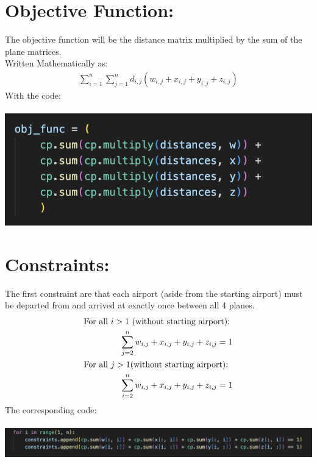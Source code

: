 \documentclass[12pt]{extarticle}
\begin{document}
\section*{\small Objective Function:}
The objective function will be the distance matrix multiplied by the sum of the plane matrices. \\
Written Mathematically as:
\begin{align*}
\sum_{i=1}^n\sum_{j=1}^nd_{i,j}(w_{i,j} + x_{i,j} + y_{i,j} + z_{i,j})
\end{align*}
With the code: \\ \\
\includegraphics[scale = .5]{images/ObjFunc.png}
\section*{\small Constraints:}
The first constraint are that each airport (aside from the starting airport) must be departed from and arrived at exactly once between all 4 planes.
\begin{align*}
&\text{For all } i > 1 \text{ (without starting airport):} \\
&\hspace{1.5cm}\sum_{j=2}^n w_{i,j} + x_{i,j} + y_{i,j} + z_{i,j} = 1 \\
&\text{For all } j > 1 \text{(without starting airport):} \\
&\hspace{1.5cm}\sum_{i=2}^n w_{i,j} + x_{i,j} + y_{i,j} + z_{i,j} = 1 \\
\end{align*}
The corresponding code: \\ \\
\includegraphics[scale = .5]{images/constraints1.png} \\
\end{document}
